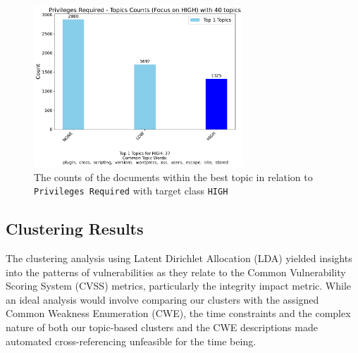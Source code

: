 \documentclass[12pt]{article}
\begin{document}

\begin{figure}[h!]
	\centering
	\includegraphics[width=0.7\textwidth]{figures/privilegesRequired/merged_top_k_topics_category_focus_counts_privilegesRequired_HIGH_k1.pdf}

	\caption{The counts of the documents within the best topic in relation to \texttt{Privileges Required} with
		target class \texttt{HIGH}}

	\label{fig:priviledgesRequired_BAD}
\end{figure}



\subsection{Clustering Results}

The clustering analysis using Latent Dirichlet Allocation (LDA) yielded insights into the patterns
of vulnerabilities as they relate to the Common Vulnerability Scoring System (CVSS) metrics,
particularly the integrity impact metric. While an ideal analysis would involve comparing our
clusters with the assigned Common Weakness Enumeration (CWE), the time constraints and the complex
nature of both our topic-based clusters and the CWE descriptions made automated cross-referencing
unfeasible for the time being.
\end{document}
